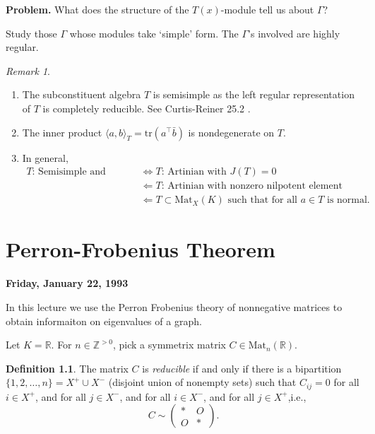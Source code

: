 \documentclass[
]{book}
\providecommand{\tightlist}{%
  \setlength{\itemsep}{0pt}\setlength{\parskip}{0pt}}
\theoremstyle{definition}
\newtheorem{definition}{Definition}[chapter]
\theoremstyle{definition}
\theoremstyle{definition}
\theoremstyle{definition}
\theoremstyle{remark}
\newtheorem*{remark}{Remark}
\begin{document}
\textbf{Problem. }
What does the structure of the \(T(x)\)-module tell us about \(\Gamma\)?

Study those \(\Gamma\) whose modules take `simple' form. The \(\Gamma\)'s involved are highly regular.

\begin{remark}
\leavevmode

\begin{enumerate}
\def\labelenumi{\arabic{enumi}.}
\tightlist
\item
  The subconstituent algebra \(T\) is semisimple as the left regular representation of \(T\) is completely reducible. See Curtis-Reiner 25.2 \citep{cr}.
\item
  The inner product \(\langle a, b\rangle_T = \mathrm{tr}(a^\top\bar{b})\) is nondegenerate on \(T\).
\item
  In general,
  \begin{align*}
  T\textrm{: Semisimple and Artinian} & \Leftrightarrow T\textrm{: Artinian with } J(T) = 0 \\
  & \Leftarrow T\textrm{: Artinian with nonzero nilpotent element} \\
  & \Leftarrow T \subset \mathrm{Mat}_X(K) \textrm{ such that for all } a\in T \textrm{ is normal.}
  \end{align*}
\end{enumerate}

\end{remark}

\hypertarget{lec2}{%
\chapter{Perron-Frobenius Theorem}\label{lec2}}

\textbf{Friday, January 22, 1993}

In this lecture we use the Perron Frobenius theory of nonnegative matrices to obtain informaiton on eigenvalues of a graph.

Let \(K = \mathbb{R}\). For \(n\in \mathbb{Z}^{> 0}\), pick a symmetrix matrix \(C\in \mathrm{Mat}_n(\mathbb{R})\).

\begin{definition}
The matrix \(C\) is \emph{reducible} if and only if there is a bipartition \(\{1, 2, \ldots, n\} = X^+ \cup X^-\) (disjoint union of nonempty sets) such that \(C_{ij} = 0\) for all \(i\in X^+\), and for all \(j\in X^-\), and for all \(i\in X^-\), and for all \(j\in X^+\),i.e.,
\[ C \sim \begin{pmatrix} \ast & O \\ O & \ast \end{pmatrix}.\]
\end{definition}
\end{document}
